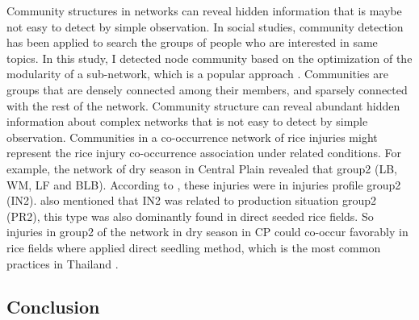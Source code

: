 Community structures in networks can reveal hidden information that is maybe not easy to detect by simple observation. In social studies, community detection has been applied to search the groups of people who are interested in same topics.   In this study, I detected node community based on the optimization of the modularity of a sub-network, which is a popular approach \cite{Liu_2014_Detecting}. Communities are groups that are densely connected among their members, and sparsely connected with the rest of the network. Community structure can reveal abundant hidden information about complex networks that is not easy to detect by simple observation. Communities in a co-occurrence network of rice injuries might represent the rice injury co-occurrence association under related conditions. For example, the network of dry season in Central Plain revealed that group2 (LB, WM, LF and BLB).  According to \citet{Savary_2000_Characterization}, these injuries were in injuries profile group2 (IN2). \citet{Savary_2000_Characterization} also mentioned that IN2 was related to production situation group2 (PR2), this type was also dominantly found in direct seeded rice fields. So injuries in group2 of the network in dry season in CP could co-occur favorably in rice fields where applied direct seedling method, which is the most common practices in Thailand \citep{IRRI_2013_Rice}. 
\subsection{Conclusion}


